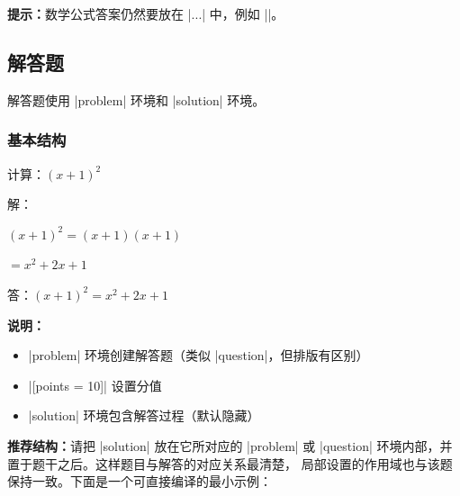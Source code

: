 \textbf{提示：}数学公式答案仍然要放在 |$...$| 中，例如 |\fillin[$x^2 + 1$]|。


\subsection{解答题}

解答题使用 |problem| 环境和 |solution| 环境。

\subsubsection{基本结构}

\begin{latexcode}
  \begin{problem}[points = 10]
    计算：$(x + 1)^2$

    \begin{solution}
      解：

      $(x + 1)^2 = (x + 1)(x + 1)$

      $= x^2 + 2x + 1$

      答：$(x + 1)^2 = x^2 + 2x + 1$
    \end{solution}
  \end{problem}
\end{latexcode}

\textbf{说明：}
\begin{itemize}
  \item |problem| 环境创建解答题（类似 |question|，但排版有区别）
  \item |[points = 10]| 设置分值
  \item |solution| 环境包含解答过程（默认隐藏）
\end{itemize}

\textbf{推荐结构：}请把 |solution| 放在它所对应的 |problem| 或
|question| 环境内部，并置于题干之后。这样题目与解答的对应关系最清楚，
局部设置的作用域也与该题保持一致。下面是一个可直接编译的最小示例：


